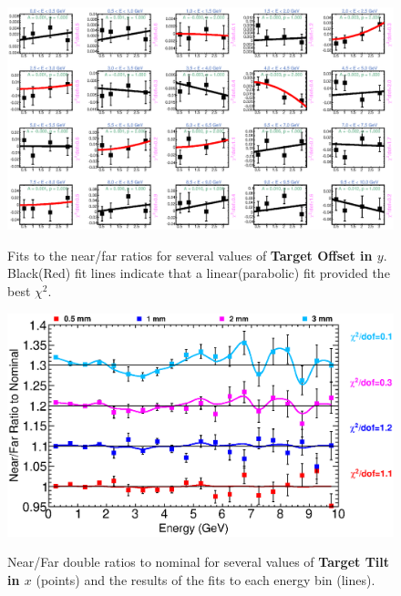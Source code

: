 {\begin{figure}[ht]
  \begin{center}
    {\includegraphics[width=5.0in]{figures/TargetYOffset_nof_fits.eps}}
  \end{center}
\caption{ Fits to the near/far ratios for several values of {\bf Target Offset in $y$}. Black(Red) fit lines indicate that a linear(parabolic) fit provided the best $\chi^2$. }
\end{figure}

\begin{figure}[ht]
  \begin{center}
    {\includegraphics[width=6.0in]{figures/TargetXTilt_nof_summary.eps}}
  \end{center}
\caption{ Near/Far double ratios to nominal for several values of {\bf Target Tilt in $x$} (points) and the results of the fits to each energy bin (lines).}
\end{figure}

}
